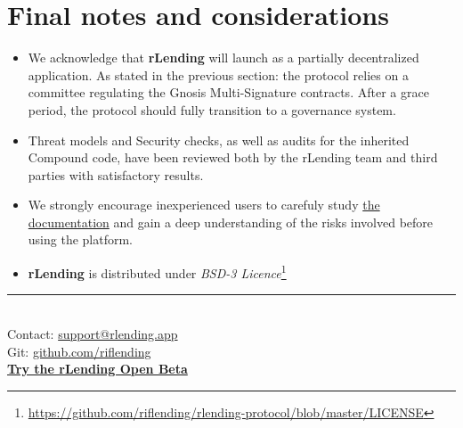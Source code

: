 \documentclass{article}
\begin{document}
\section{Final notes and considerations}

\begin{itemize}
\item We acknowledge that \textbf{rLending} will launch as a partially decentralized application. As stated in the previous section: the protocol relies on a committee regulating the Gnosis Multi-Signature contracts. After a grace period, the protocol should fully transition to a governance system.
\item Threat models and Security checks, as well as audits for the inherited Compound code, have been reviewed both by the rLending team and third parties with satisfactory results.
\item We strongly encourage inexperienced users to carefuly study \href{https://test.rlending.app/doc}{the documentation} and gain a deep understanding of the risks involved before using the platform.
\item \textbf{rLending} is distributed under \textit{BSD-3 Licence}\footnote{\href{https://github.com/riflending/rlending-protocol/blob/master/LICENSE}{https://github.com/riflending/rlending-protocol/blob/master/LICENSE}}
\\[0.1in]
\end{itemize}
\begin{center}
\noindent\rule{8cm}{0.4pt}
\\[0.5in]
Contact: \href{mailto:support@rlending.app}{support@rlending.app}\\
Git: \href{https://github.com/riflending/rlending-protocol}{github.com/riflending}\\[0.1in]
\textbf{\href{https://test.rlending.app}{Try the rLending Open Beta}}

\end{center}


\end{document}
